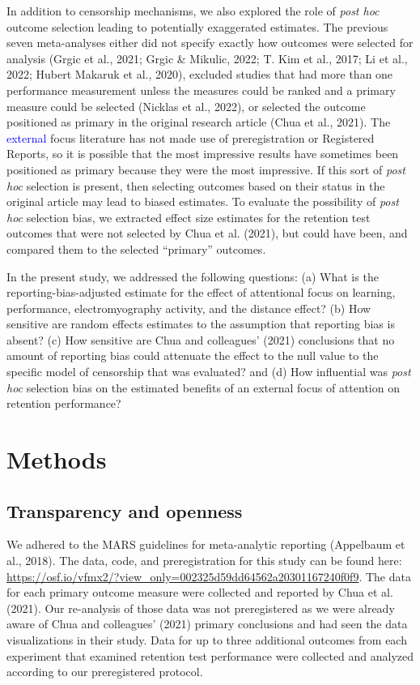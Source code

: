 \documentclass[
  man, donotrepeattitle,floatsintext]{apa7}
\begin{document}
In addition to censorship mechanisms, we also explored the role of \emph{post hoc} outcome selection leading to potentially exaggerated estimates. The previous seven meta-analyses either did not specify exactly how outcomes were selected for analysis (Grgic et al., 2021; Grgic \& Mikulic, 2022; T. Kim et al., 2017; Li et al., 2022; Hubert Makaruk et al., 2020), excluded studies that had more than one performance measurement unless the measures could be ranked and a primary measure could be selected (Nicklas et al., 2022), or selected the outcome positioned as primary in the original research article (Chua et al., 2021). The \textcolor{blue}{external} focus literature has not made use of preregistration or Registered Reports, so it is possible that the most impressive results have sometimes been positioned as primary because they were the most impressive. If this sort of \emph{post hoc} selection is present, then selecting outcomes based on their status in the original article may lead to biased estimates. To evaluate the possibility of \emph{post hoc} selection bias, we extracted effect size estimates for the retention test outcomes that were not selected by Chua et al. (2021), but could have been, and compared them to the selected ``primary'' outcomes.

In the present study, we addressed the following questions: (a) What is the reporting-bias-adjusted estimate for the effect of attentional focus on learning, performance, electromyography activity, and the distance effect? (b) How sensitive are random effects estimates to the assumption that reporting bias is absent? (c) How sensitive are Chua and colleagues' (2021) conclusions that no amount of reporting bias could attenuate the effect to the null value to the specific model of censorship that was evaluated? and (d) How influential was \emph{post hoc} selection bias on the estimated benefits of an external focus of attention on retention performance?

\hypertarget{methods}{%
\section{Methods}\label{methods}}

\hypertarget{transparency-and-openness}{%
\subsection{Transparency and openness}\label{transparency-and-openness}}

We adhered to the MARS guidelines for meta-analytic reporting (Appelbaum et al., 2018). The data, code, and preregistration for this study can be found here: \url{https://osf.io/vfmx2/?view_only=002325d59dd64562a20301167240f0f9}. The data for each primary outcome measure were collected and reported by Chua et al. (2021). Our re-analysis of those data was not preregistered as we were already aware of Chua and colleagues' (2021) primary conclusions and had seen the data visualizations in their study. Data for up to three additional outcomes from each experiment that examined retention test performance were collected and analyzed according to our preregistered protocol.
\end{document}
